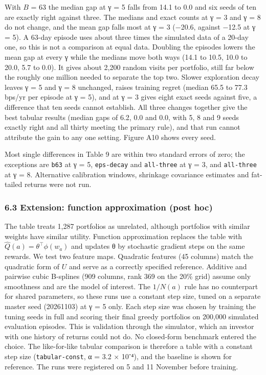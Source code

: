 \documentclass[
  11pt]{article}
\begin{document}
With \(B\) = 63 the median gap at γ = 5 falls from 14.1 to 0.0 and six
seeds of ten are exactly right against three. The medians and exact
counts at γ = 3 and γ = 8 do not change, and the mean gap falls most at
γ = 3 (−20.6, against −12.5 at γ = 5). A 63-day episode uses about three
times the simulated data of a 20-day one, so this is not a comparison at
equal data. Doubling the episodes lowers the mean gap at every γ while
the medians move both ways (14.1 to 10.5, 10.0 to 20.0, 5.7 to 0.0). It
gives about 2,200 random visits per portfolio, still far below the
roughly one million needed to separate the top two. Slower exploration
decay leaves γ = 5 and γ = 8 unchanged, raises training regret (median
65.5 to 77.3 bps/yr per episode at γ = 5), and at γ = 3 gives eight
exact seeds against five, a difference that ten seeds cannot establish.
All three changes together give the best tabular results (median gaps of
6.2, 0.0 and 0.0, with 5, 8 and 9 seeds exactly right and all thirty
meeting the primary rule), and that run cannot attribute the gain to any
one setting. Figure A10 shows every seed.

Most single differences in Table 9 are within two standard errors of
zero; the exceptions are \texttt{b63} at γ = 5, \texttt{eps-decay} and
\texttt{all-three} at γ = 3, and \texttt{all-three} at γ = 8.
Alternative calibration windows, shrinkage covariance estimates and
fat-tailed returns were not run.

\subsubsection{6.3 Extension: function approximation (post
hoc)}\label{extension-function-approximation-post-hoc}

The table treats 1,287 portfolios as unrelated, although portfolios with
similar weights have similar utility. Function approximation replaces
the table with \(\hat{Q}(a) = \theta^\top \phi(w_a)\) and updates θ by
stochastic gradient steps on the same rewards. We test two feature maps.
Quadratic features (45 columns) match the quadratic form of \(U\) and
serve as a correctly specified reference. Additive and pairwise cubic
B-splines (909 columns, rank 369 on the 20\% grid) assume only
smoothness and are the model of interest. The \(1/N(a)\) rule has no
counterpart for shared parameters, so these runs use a constant step
size, tuned on a separate master seed (20261103) at γ = 5 only. Each
step size was chosen by training the tuning seeds in full and scoring
their final greedy portfolios on 200,000 simulated evaluation episodes.
This is validation through the simulator, which an investor with one
history of returns could not do. No closed-form benchmark entered the
choice. The like-for-like tabular comparison is therefore a table with a
constant step size (\texttt{tabular-const}, α = 3.2 × 10⁻⁴), and the
baseline is shown for reference. The runs were registered on 5 and 11
November before training.
\end{document}
